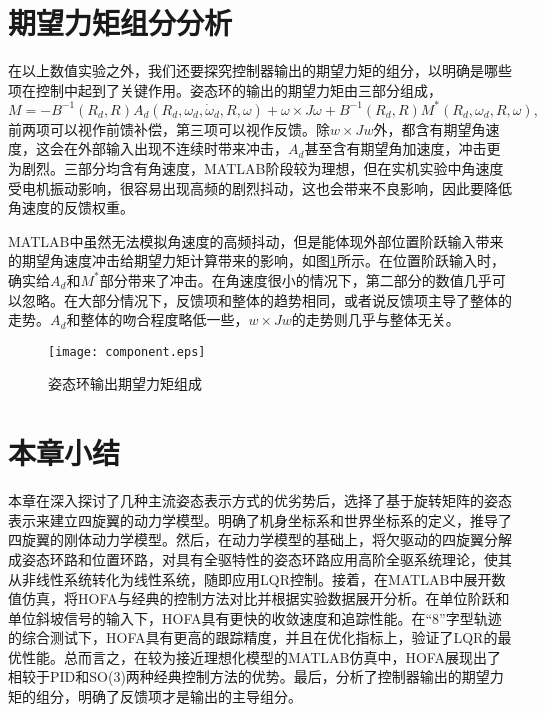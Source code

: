 

\section{期望力矩组分分析}
在以上数值实验之外，我们还要探究控制器输出的期望力矩的组分，以明确是哪些项在控制中起到了关键作用。姿态环的输出的期望力矩由三部分组成，
$$M=-B^{-1}(R_d,R) A_d(R_d,\omega_d,\dot \omega_d,R,\omega)+\omega \times J\omega +B^{-1}(R_d,R)M^*(R_d,\omega_d,R,\omega),$$
前两项可以视作前馈补偿，第三项可以视作反馈。除$w\times Jw$外，都含有期望角速度，这会在外部输入出现不连续时带来冲击，$A_d$甚至含有期望角加速度，冲击更为剧烈。三部分均含有角速度，MATLAB阶段较为理想，但在实机实验中角速度受电机振动影响，很容易出现高频的剧烈抖动，这也会带来不良影响，因此要降低角速度的反馈权重。

MATLAB中虽然无法模拟角速度的高频抖动，但是能体现外部位置阶跃输入带来的期望角速度冲击给期望力矩计算带来的影响，如图\ref{fig:com}所示。在位置阶跃输入时，确实给$A_d$和$M^*$部分带来了冲击。在角速度很小的情况下，第二部分的数值几乎可以忽略。在大部分情况下，反馈项和整体的趋势相同，或者说反馈项主导了整体的走势。$A_d$和整体的吻合程度略低一些，$w\times Jw$的走势则几乎与整体无关。
\begin{figure}[!h]
  \centering
  \texttt{[image: component.eps]}
  \caption{姿态环输出期望力矩组成}
  \label{fig:com}
\end{figure}
\newpage
\newpage
\section{本章小结}
本章在深入探讨了几种主流姿态表示方式的优劣势后，选择了基于旋转矩阵的姿态表示来建立四旋翼的动力学模型。明确了机身坐标系和世界坐标系的定义，推导了四旋翼的刚体动力学模型。然后，在动力学模型的基础上，将欠驱动的四旋翼分解成姿态环路和位置环路，对具有全驱特性的姿态环路应用高阶全驱系统理论，使其从非线性系统转化为线性系统，随即应用LQR控制。接着，在MATLAB中展开数值仿真，将HOFA与经典的控制方法对比并根据实验数据展开分析。在单位阶跃和单位斜坡信号的输入下，HOFA具有更快的收敛速度和追踪性能。在“8”字型轨迹的综合测试下，HOFA具有更高的跟踪精度，并且在优化指标上，验证了LQR的最优性能。总而言之，在较为接近理想化模型的MATLAB仿真中，HOFA展现出了相较于PID和SO(3)两种经典控制方法的优势。最后，分析了控制器输出的期望力矩的组分，明确了反馈项才是输出的主导组分。